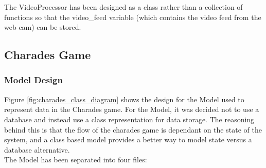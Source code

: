 The VideoProcessor has been designed as a class rather than a collection of functions so that the video\_feed variable (which contains the video feed from the web cam) can be stored.

\newpage

\subsection{Charades Game}
\subsubsection{Model Design}
\begin{figure}[h!]
\end{figure}

Figure \ref{fig:charades_class_diagram} shows the design for the Model used to represent data in the Charades game. For the Model, it was decided not to use a database and instead use a class representation for data storage. The reasoning behind this is that the flow of the charades game is dependant on the state of the system, and a class based model provides a better way to model state versus a database alternative.\\
The Model has been separated into four files:

